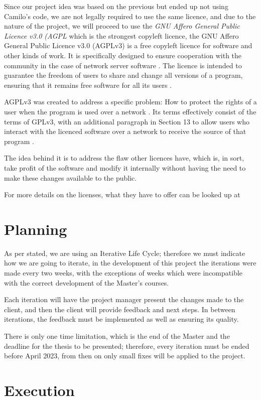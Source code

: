 Since our project idea was based on the previous but ended up not using Camilo's code, we are not legally required to use the same licence, and due to the nature of the project, we will proceed to use the \textit{GNU Affero General Public Licence v3.0 (AGPL} which is the strongest copyleft licence, the GNU Affero General Public Licence v3.0 (AGPLv3) is a free copyleft licence for software and other kinds of work. It is specifically designed to ensure cooperation with the community in the case of network server software \cite{fsf1}. The licence is intended to guarantee the freedom of users to share and change all versions of a program, ensuring that it remains free software for all its users \cite{fsf1}.


 AGPLv3 was created to address a specific problem: How to protect the rights of a user when the program is used over a network \cite{fsf2}. Its terms effectively consist of the terms of GPLv3, with an additional paragraph in Section 13 to allow users who interact with the licenced software over a network to receive the source of that program \cite{fsf3}. 


The idea behind it is to address the flaw other licences have, which is, in sort, take profit of the software and modify it internally without having the need to make these changes available to the public.


For more details on the licenses, what they have to offer can be looked up at \cite{choosealicense}\cite{opensourceorg}
\section{Planning}
As per stated, we are using an Iterative Life Cycle; therefore we must indicate how we are going to iterate, in the development of this project the iterations were made every two weeks, with the exceptions of weeks which were incompatible with the correct development of the Master's courses.

Each iteration will have the project manager present the changes made to the client, and then the client will provide feedback and next steps. In between iterations, the feedback must be implemented as well as ensuring its quality.

There is only one time limitation, which is the end of the Master and the deadline for the thesis to be presented; therefore, every iteration must be ended before April 2023, from then on only small fixes will be applied to the project.
\section{Execution}
